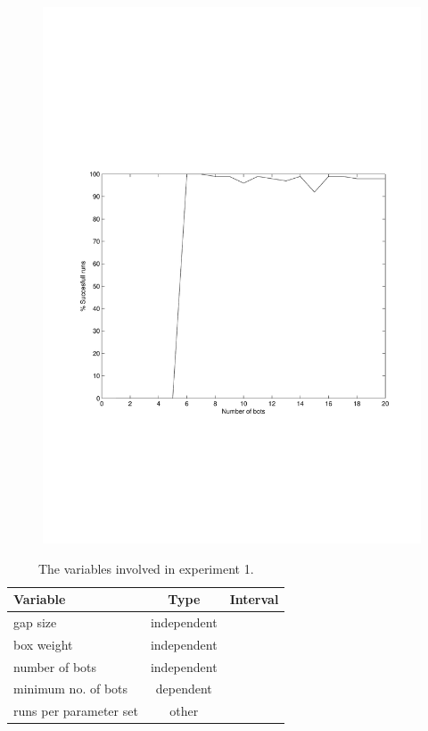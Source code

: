 \begin{figure}
{\begin{minipage}[b]{0.5\linewidth}
    \includegraphics[width=\linewidth]{results/experiment1/plot10}
    \end{minipage}
}
\end{figure}
\begin{table}
 \caption{The variables involved in experiment 1.}
 \begin{center}
  \begin{tabular}{| p{5cm} | c | c |}
   \hline
   \centering \textbf{Variable} & \textbf{Type} & \textbf{Interval} \\ \hline
   gap size & independent & \\ \hline
   box weight & independent & \\ \hline
   number of bots & independent & \\ \hline
   minimum no. of bots & dependent &  \\ \hline
   runs per parameter set & other & \\ \hline
  \end{tabular}
 \end{center}
 \label{tbl:exp1}
\end{table}
